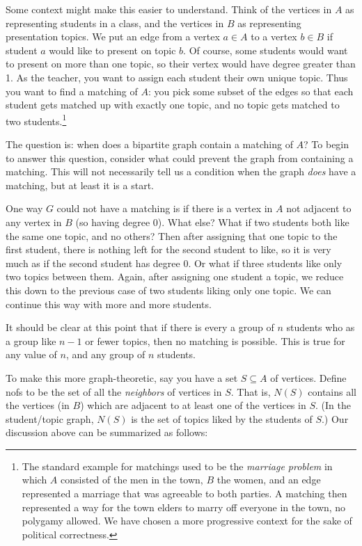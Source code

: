 \documentclass[12pt]{article}
\begin{document}
Some context might make this easier to understand.  Think of the vertices in $A$ as representing students in a class, and the vertices in $B$ as representing presentation topics.  We put an edge from a vertex  $a \in A$ to a vertex $b \in B$ if student $a$ would like to present on topic $b$.  Of course, some students would want to present on more than one topic, so their vertex would have degree greater than 1.  As the teacher, you want to assign each student their own unique topic.  Thus you want to find a matching of $A$: you pick some subset of the edges so that each student gets matched up with exactly one topic, and no topic gets matched to two students.\footnote{The standard example for matchings used to be the {\em marriage problem} in which $A$ consisted of the men in the town, $B$ the women, and an edge represented a marriage that was agreeable to both parties.  A matching then represented a way for the town elders to marry off everyone in the town, no polygamy allowed.  We have chosen a more progressive context for the sake of political correctness.}

The question is: when does a bipartite graph contain a matching of $A$?  To begin to answer this question, consider what could prevent the graph from containing a matching.  This will not necessarily tell us a condition when the graph {\em does} have a matching, but at least it is a start.

One way $G$ could not have a matching is if there is a vertex in $A$ not adjacent to any vertex in $B$ (so having degree 0).  What else?  What if two students both like the same one topic, and no others?  Then after assigning that one topic to the first student, there is nothing left for the second student to like, so it is very much as if the second student has degree 0.  Or what if three students like only two topics between them.  Again, after assigning one student a topic, we reduce this down to the previous case of two students liking only one topic.  We can continue this way with more and more students.

It should be clear at this point that if there is every a group of $n$ students who as a group like $n-1$ or fewer topics, then no matching is possible.  This is true for any value of $n$, and any group of $n$ students.

To make this more graph-theoretic, say you have a set $S \subseteq A$ of vertices.  Define \gls{nofs} to be the set of all the \emph{neighbors} of vertices in $S$.  That is, $N(S)$ contains all the vertices (in $B$) which are adjacent to at least one of the vertices in $S$.  (In the student/topic graph, $N(S)$ is the set of topics liked by the students of $S$.)  Our discussion above can be summarized as follows:
\end{document}
